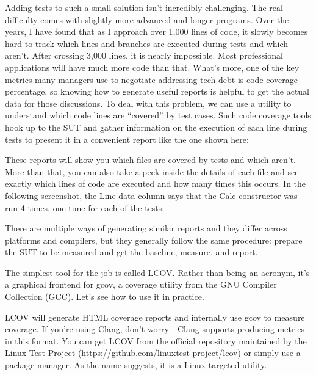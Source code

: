 
Adding tests to such a small solution isn’t incredibly challenging. The real difficulty comes with slightly more advanced and longer programs. Over the years, I have found that as I approach over 1,000 lines of code, it slowly becomes hard to track which lines and branches are executed during tests and which aren’t. After crossing 3,000 lines, it is nearly impossible. Most professional applications will have much more code than that. What’s more, one of the key metrics many managers use to negotiate addressing tech debt is code coverage percentage, so knowing how to generate useful reports is helpful to get the actual data for those discussions. To deal with this problem, we can use a utility to understand which code lines are “covered” by test cases. Such code coverage tools hook up to the SUT and gather information on the execution of each line during tests to present it in a convenient report like the one shown here:


These reports will show you which files are covered by tests and which aren’t. More than that, you can also take a peek inside the details of each file and see exactly which lines of code are executed and how many times this occurs. In the following screenshot, the Line data column says that the Calc constructor was run 4 times, one time for each of the tests:


There are multiple ways of generating similar reports and they differ across platforms and compilers, but they generally follow the same procedure: prepare the SUT to be measured and get the baseline, measure, and report.

The simplest tool for the job is called LCOV. Rather than being an acronym, it’s a graphical frontend for gcov, a coverage utility from the GNU Compiler Collection (GCC). Let’s see how to use it in practice.


LCOV will generate HTML coverage reports and internally use gcov to measure coverage. If you’re using Clang, don’t worry—Clang supports producing metrics in this format. You can get LCOV from the official repository maintained by the Linux Test Project (\url{https://github.com/linuxtest-project/lcov}) or simply use a package manager. As the name suggests, it is a Linux-targeted utility.

